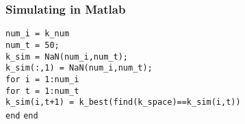 \documentclass{beamer}
\begin{document}






\begin{frame}
\frametitle[alignment=center]{Simulating in Matlab}
\scriptsize
\texttt{num\_i = k\_num}\\
\texttt{num\_t = 50;}\\
\texttt{k\_sim = NaN(num\_i,num\_t);}\\
\texttt{k\_sim(:,1) = NaN(num\_i,num\_t);}\\
\texttt{for i = 1:num\_i}\\
\texttt{for t = 1:num\_t}\\
\texttt{k\_sim(i,t+1) = k\_best(find(k\_space)==k\_sim(i,t))}\\
\texttt{end}
\texttt{end}
\end{frame}
\end{document}

